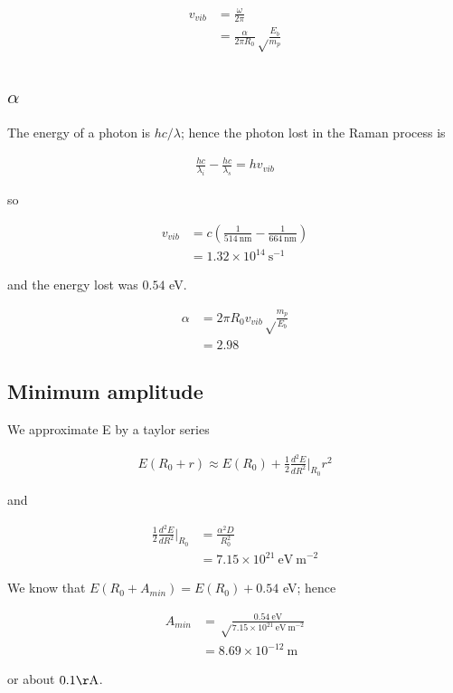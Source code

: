 \documentclass{article}
\begin{document}
\begin{align*}
v_{vib} &= \frac{\omega}{2\pi} \\
&= \frac{\alpha}{2\pi R_0}\sqrt\frac{E_b}{m_p}
\end{align*}

\subsection{$\alpha$}

The energy of a photon is $hc/\lambda$; hence the photon lost in the Raman process is

\begin{align*}
\frac{hc}{\lambda_i} - \frac{hc}{\lambda_s} = h v_{vib}
\end{align*}

so

\begin{align*}
v_{vib} &= c\left(\frac{1}{514\mathrm{\ nm}} - \frac{1}{664\mathrm{\ nm}}\right) \\
&= 1.32 \times 10^{14}\mathrm{\ s^{-1}}
\end{align*}

and the energy lost was $0.54$ eV.

\begin{align*}
\alpha &= 2\pi R_0 v_{vib} \sqrt\frac{m_p}{E_b} \\
&= 2.98
\end{align*}

\subsection{Minimum amplitude}

We approximate E by a taylor series

\begin{align*}
E(R_0 + r) \approx E(R_0) + \frac{1}{2} \frac{d^2E}{dR^2}\Big|_{R_0} r^2
\end{align*}

and

\begin{align*}
\frac{1}{2} \frac{d^2E}{dR^2}\Big|_{R_0} &= \frac{\alpha^2D}{R_0^2} \\
&= 7.15 \times 10^{21}\mathrm{\ eV\ m}^{-2}
\end{align*}

We know that $E(R_0 + A_{min}) = E(R_0) + 0.54$ eV; hence

\begin{align*}
A_{min} &= \sqrt\frac{0.54\mathrm{\ eV}}{7.15 \times 10^{21}\mathrm{\ eV\ m}^{-2}}\\
&= 8.69 \times 10^{-12} \mathrm{\ m}
\end{align*}

or about $0.1\mathrm{ \AA}$.
\end{document}
